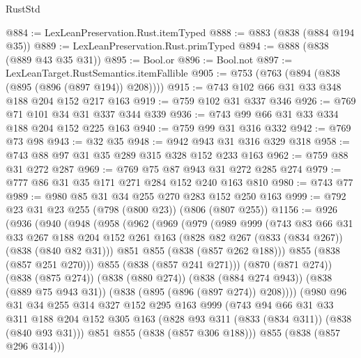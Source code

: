\begin{lexlean}{RustStd}
\begin{coremodule}
@884 := LexLeanPreservation.Rust.itemTyped
@888 := @883 (@838 (@884 @194 @35))
@889 := LexLeanPreservation.Rust.primTyped
@894 := @888 (@838 (@889 @43 @35 @31))
@895 := Bool.or
@896 := Bool.not
@897 := LexLeanTarget.RustSemantics.itemFallible
@905 := @753 (@763 (@894 (@838 (@895 (@896 (@897 @194)) @208))))
@915 := @743 @102 @66 @31 @33 @348 @188 @204 @152 @217 @163
@919 := @759 @102 @31 @337 @346
@926 := @769 @71 @101 @34 @31 @337 @344 @339
@936 := @743 @99 @66 @31 @33 @334 @188 @204 @152 @225 @163
@940 := @759 @99 @31 @316 @332
@942 := @769 @73 @98
@943 := @32 @35
@948 := @942 @943 @31 @316 @329 @318
@958 := @743 @88 @97 @31 @35 @289 @315 @328 @152 @233 @163
@962 := @759 @88 @31 @272 @287
@969 := @769 @75 @87 @943 @31 @272 @285 @274
@979 := @777 @86 @31 @35 @171 @271 @284 @152 @240 @163 @810
@980 := @743 @77
@989 := @980 @85 @31 @34 @255 @270 @283 @152 @250 @163
@999 := @792 @23 @31 @23 @255 (@798 (@800 @23)) (@806 (@807 @255))
@1156 := @926
    (@936
      (@940
        (@948
          (@958
            (@962
              (@969
                (@979
                  (@989
                    @999
                    (@743
                      @83
                      @66
                      @31
                      @33
                      @267
                      @188
                      @204
                      @152
                      @261
                      @163
                      (@828 @82 @267 (@833 (@834 @267)) (@838 (@840 @82 @31)))
                      @851
                      @855
                      (@838 (@857 @262 @188)))
                    @855
                    (@838 (@857 @251 @270)))
                  @855
                  (@838 (@857 @241 @271)))
                (@870 (@871 @274))
                (@838 (@875 @274))
                (@838 (@880 @274))
                (@838 (@884 @274 @943))
                (@838 (@889 @75 @943 @31))
                (@838 (@895 (@896 (@897 @274)) @208))))
            (@980
              @96
              @31
              @34
              @255
              @314
              @327
              @152
              @295
              @163
              @999
              (@743
                @94
                @66
                @31
                @33
                @311
                @188
                @204
                @152
                @305
                @163
                (@828 @93 @311 (@833 (@834 @311)) (@838 (@840 @93 @31)))
                @851
                @855
                (@838 (@857 @306 @188)))
              @855
              (@838 (@857 @296 @314)))

\end{coremodule}
\end{lexlean}
